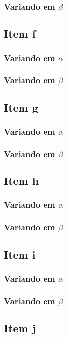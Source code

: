\documentclass[a4paper, 12pt]{article}
\begin{document}
			\subsubsection{Variando em $\beta$}	
		\subsection{Item f}					
			\subsubsection{Variando em $\alpha$}
			\subsubsection{Variando em $\beta$}
		\subsection{Item g}		
			\subsubsection{Variando em $\alpha$}
			\subsubsection{Variando em $\beta$}
		\subsection{Item h}		
			\subsubsection{Variando em $\alpha$}
			\subsubsection{Variando em $\beta$}	
		\subsection{Item i}			
			\subsubsection{Variando em $\alpha$}
			\subsubsection{Variando em $\beta$}
		\subsection{Item j}		
\end{document}
